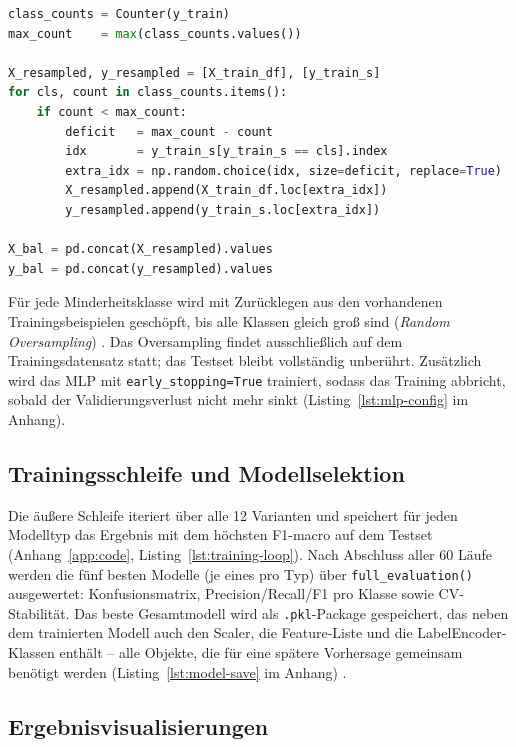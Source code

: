 \begin{lstlisting}[language=Python, caption={Manuelles Oversampling für das MLP},
                   label={lst:mlp-oversampling}]
class_counts = Counter(y_train)
max_count    = max(class_counts.values())

X_resampled, y_resampled = [X_train_df], [y_train_s]
for cls, count in class_counts.items():
    if count < max_count:
        deficit   = max_count - count
        idx       = y_train_s[y_train_s == cls].index
        extra_idx = np.random.choice(idx, size=deficit, replace=True)
        X_resampled.append(X_train_df.loc[extra_idx])
        y_resampled.append(y_train_s.loc[extra_idx])

X_bal = pd.concat(X_resampled).values
y_bal = pd.concat(y_resampled).values
\end{lstlisting}

Für jede Minderheitsklasse wird mit Zurücklegen aus den vorhandenen
Trainingsbeispielen geschöpft, bis alle Klassen gleich groß sind
(\textit{Random Oversampling}) \cite{ChawlaEtAl2002}. Das Oversampling
findet ausschließlich auf dem Trainingsdatensatz statt; das Testset
bleibt vollständig unberührt. Zusätzlich wird das MLP mit
\texttt{early\_stopping=True} trainiert, sodass das Training abbricht,
sobald der Validierungsverlust nicht mehr sinkt \cite{GoodfellowEtAl2016}
(Listing~\ref{lst:mlp-config} im Anhang).

\subsection{Trainingsschleife und Modellselektion}

Die äußere Schleife iteriert über alle 12 Varianten und speichert für
jeden Modelltyp das Ergebnis mit dem höchsten F1-macro auf dem Testset
(Anhang~\ref{app:code}, Listing~\ref{lst:training-loop}).
Nach Abschluss aller 60 Läufe werden die fünf besten Modelle
(je eines pro Typ) über \texttt{full\_evaluation()} ausgewertet:
Konfusionsmatrix, Precision/Recall/F1 pro Klasse sowie CV-Stabilität.
Das beste Gesamtmodell wird als \texttt{.pkl}-Package gespeichert, das
neben dem trainierten Modell auch den Scaler, die Feature-Liste und die
LabelEncoder-Klassen enthält -- alle Objekte, die für eine spätere
Vorhersage gemeinsam benötigt werden (Listing~\ref{lst:model-save}
im Anhang) \cite{ScikitLearn2024}.

\subsection{Ergebnisvisualisierungen}

